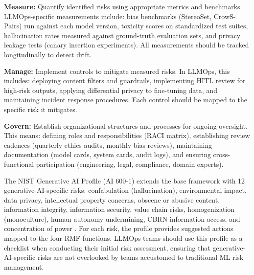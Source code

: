 \textbf{Measure:} Quantify identified risks using appropriate metrics and benchmarks. LLMOps-specific measurements include: bias benchmarks (StereoSet, CrowS-Pairs) run against each model version, toxicity scores on standardized test suites, hallucination rates measured against ground-truth evaluation sets, and privacy leakage tests (canary insertion experiments). All measurements should be tracked longitudinally to detect drift.

\textbf{Manage:} Implement controls to mitigate measured risks. In LLMOps, this includes: deploying content filters and guardrails, implementing HITL review for high-risk outputs, applying differential privacy to fine-tuning data, and maintaining incident response procedures. Each control should be mapped to the specific risk it mitigates.

\textbf{Govern:} Establish organizational structures and processes for ongoing oversight. This means: defining roles and responsibilities (RACI matrix), establishing review cadences (quarterly ethics audits, monthly bias reviews), maintaining documentation (model cards, system cards, audit logs), and ensuring cross-functional participation (engineering, legal, compliance, domain experts).


The NIST Generative AI Profile (AI 600-1) extends the base framework with 12 generative-AI-specific risks: confabulation (hallucination), environmental impact, data privacy, intellectual property concerns, obscene or abusive content, information integrity, information security, value chain risks, homogenization (monoculture), human autonomy undermining, CBRN information access, and concentration of power \cite{nist_ai_600_1_genai}. For each risk, the profile provides suggested actions mapped to the four RMF functions. LLMOps teams should use this profile as a checklist when conducting their initial risk assessment, ensuring that generative-AI-specific risks are not overlooked by teams accustomed to traditional ML risk management.

